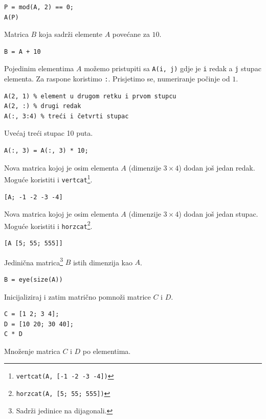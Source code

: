 \documentclass[a4paper, 10pt]{article}
\begin{document}
\begin{lstlisting}
P = mod(A, 2) == 0;
A(P)
\end{lstlisting}

Matrica $B$ koja sadrži elemente $A$ povećane za $10$.

\begin{lstlisting}
B = A + 10
\end{lstlisting}

Pojedinim elementima $A$ možemo pristupiti sa \texttt{A(i, j)} gdje je \texttt{i} redak a \texttt{j} stupac elementa.
Za raspone koristimo \texttt{:}.
Prisjetimo se, numeriranje počinje od $1$.

\begin{lstlisting}
A(2, 1) % element u drugom retku i prvom stupcu
A(2, :) % drugi redak
A(:, 3:4) % treći i četvrti stupac
\end{lstlisting}

Uvećaj treći stupac 10 puta.

\begin{lstlisting}
A(:, 3) = A(:, 3) * 10;
\end{lstlisting}

Nova matrica kojoj je osim elementa $A$ (dimenzije $3 \times 4$) dodan još jedan redak.
Moguće koristiti i \texttt{vertcat}\footnote{\texttt{vertcat(A, [-1 -2 -3 -4])}}.

\begin{lstlisting}
[A; -1 -2 -3 -4]
\end{lstlisting}

Nova matrica kojoj je osim elementa $A$ (dimenzije $3 \times 4$) dodan još jedan stupac.
Moguće koristiti i \texttt{horzcat}\footnote{\texttt{horzcat(A, [5; 55; 555])}}.

\begin{lstlisting}
[A [5; 55; 555]]
\end{lstlisting}

Jedinična matrica\footnote{Sadrži jedinice na dijagonali.} $B$ istih dimenzija kao $A$.

\begin{lstlisting}
B = eye(size(A))
\end{lstlisting}

Inicijaliziraj i zatim matrično pomnoži matrice $C$ i $D$.

\begin{lstlisting}
C = [1 2; 3 4];
D = [10 20; 30 40];
C * D
\end{lstlisting}

Množenje matrica $C$ i $D$ po elementima.
\end{document}
